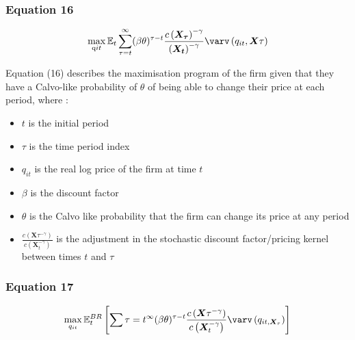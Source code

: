 \documentclass{article}
\begin{document}
\subsubsection*{Equation 16}
\begin{equation}
\max_{\text{q}{it}} \mathbb{E}_{t} \sum_{\tau=t}^{\infty}(\beta\theta)^{\tau-t} \frac{c\left(\bm{X_{\tau}}\right)^{-\gamma}}{\left(\bm{X_{t}}\right)^{-\gamma}} \varv\left(q_{it},\bm{X}{\tau}\right)
\end{equation}

Equation (16) describes the maximisation program of the firm given that they have a Calvo-like probability of $\theta$ of being able to change their price at each period, where : 

\begin{itemize}
    \item $t$ is the initial period 
    \item $\tau$ is the time period index  
    \item $q_{it}$ is the real log price of the firm at time $t$
    \item $\beta$ is the discount factor
    \item $\theta$ is the Calvo like probability that the firm can change its price at any period
    \item $\frac{c\left(\bm{X}{\tau}^{-\gamma}\right)}{c\left(\bm{X}_{t}^{-\gamma}\right)}$ is the adjustment in the stochastic discount factor/pricing kernel between times $t$ and $\tau$ 
\end{itemize}

\subsubsection*{Equation 17}
\begin{equation}
    \max_{q_{it}}{\mathbb{E}_{t}^{BR} \left[\sum{\tau=t}^{\infty}(\beta\theta)^{\tau-t}\frac{c\left(\bm{X}{\tau}^{-\gamma}\right)}{c\left(\bm{X}_{t}^{-\gamma}\right)} \varv\left(q_{it,\bm{X}_{\tau}}\right) \right]}
\end{equation}
\end{document}

